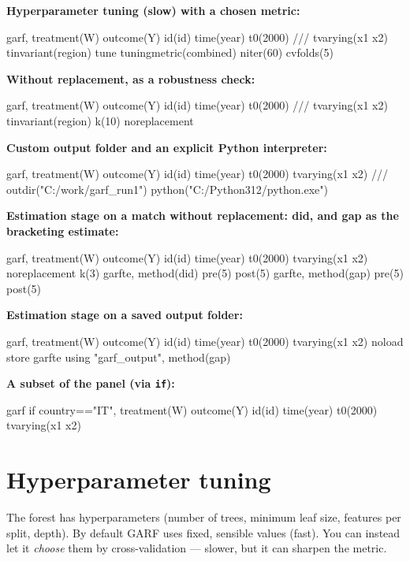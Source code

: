 \documentclass[11pt,a4paper]{article}
\begin{document}
\textbf{Hyperparameter tuning (slow) with a chosen metric:}
\begin{stata}
garf, treatment(W) outcome(Y) id(id) time(year) t0(2000) ///
      tvarying(x1 x2) tinvariant(region) tune tuningmetric(combined) niter(60) cvfolds(5)
\end{stata}

\textbf{Without replacement, as a robustness check:}
\begin{stata}
garf, treatment(W) outcome(Y) id(id) time(year) t0(2000) ///
      tvarying(x1 x2) tinvariant(region) k(10) noreplacement
\end{stata}

\textbf{Custom output folder and an explicit Python interpreter:}
\begin{stata}
garf, treatment(W) outcome(Y) id(id) time(year) t0(2000) tvarying(x1 x2) ///
      outdir("C:/work/garf_run1") python("C:/Python312/python.exe")
\end{stata}

\textbf{Estimation stage on a match without replacement: did, and gap as the bracketing estimate:}
\begin{stata}
garf, treatment(W) outcome(Y) id(id) time(year) t0(2000) tvarying(x1 x2) noreplacement k(3)
garfte, method(did) pre(5) post(5)
garfte, method(gap) pre(5) post(5)
\end{stata}

\textbf{Estimation stage on a saved output folder:}
\begin{stata}
garf, treatment(W) outcome(Y) id(id) time(year) t0(2000) tvarying(x1 x2) noload store
garfte using "garf_output", method(gap)
\end{stata}

\textbf{A subset of the panel (via \texttt{if}):}
\begin{stata}
garf if country=="IT", treatment(W) outcome(Y) id(id) time(year) t0(2000) tvarying(x1 x2)
\end{stata}

\section{Hyperparameter tuning}

The forest has hyperparameters (number of trees, minimum leaf size, features per split, depth).
By default GARF uses fixed, sensible values (fast). You can instead let it \emph{choose} them by
cross-validation --- slower, but it can sharpen the metric.
\end{document}
